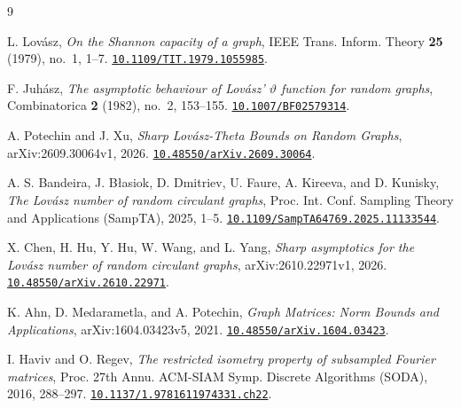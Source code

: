 \documentclass[11pt,letterpaper]{article}
\newcommand{\doi}[1]{\href{https://doi.org/#1}{\nolinkurl{#1}}}
\begin{document}
\begin{thebibliography}{9}

L. Lov\'asz, \emph{On the Shannon capacity of a graph},
IEEE Trans. Inform. Theory \textbf{25} (1979), no.~1, 1--7.
\doi{10.1109/TIT.1979.1055985}.

F. Juh\'asz, \emph{The asymptotic behaviour of Lov\'asz' \(\vartheta\)
function for random graphs}, Combinatorica \textbf{2} (1982), no.~2,
153--155.
\doi{10.1007/BF02579314}.

A. Potechin and J. Xu, \emph{Sharp Lov\'asz-Theta Bounds on Random Graphs},
arXiv:2609.30064v1, 2026. \doi{10.48550/arXiv.2609.30064}.

A. S. Bandeira, J. B{\l}asiok, D. Dmitriev, U. Faure, A. Kireeva,
and D. Kunisky, \emph{The Lov\'asz number of random circulant graphs},
Proc. Int. Conf. Sampling Theory and Applications (SampTA), 2025,
1--5.
\doi{10.1109/SampTA64769.2025.11133544}.

X. Chen, H. Hu, Y. Hu, W. Wang, and L. Yang, \emph{Sharp asymptotics for
the Lov\'asz number of random circulant graphs}, arXiv:2610.22971v1, 2026.
\doi{10.48550/arXiv.2610.22971}.

K. Ahn, D. Medarametla, and A. Potechin, \emph{Graph Matrices: Norm
Bounds and Applications}, arXiv:1604.03423v5, 2021.
\doi{10.48550/arXiv.1604.03423}.

I. Haviv and O. Regev, \emph{The restricted isometry property of
subsampled Fourier matrices}, Proc. 27th Annu. ACM-SIAM Symp.
Discrete Algorithms (SODA), 2016, 288--297.
\doi{10.1137/1.9781611974331.ch22}.

\end{thebibliography}
\end{document}
